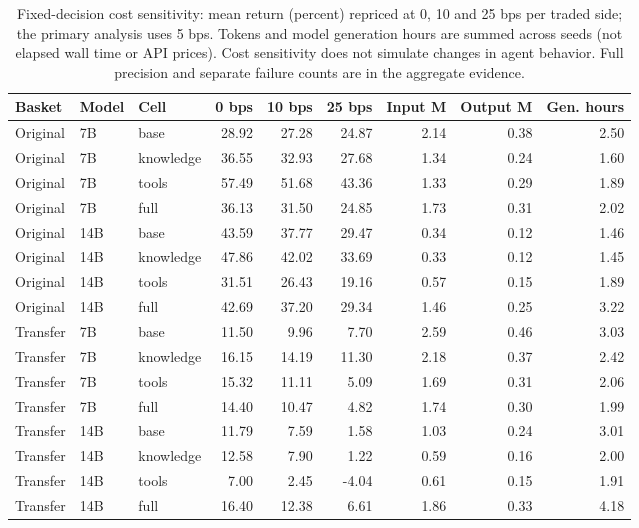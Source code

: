 \begin{table}[t]
\centering\small
\setlength{\tabcolsep}{4pt}
\begin{tabular}{lllrrrrrr}
\toprule
Basket & Model & Cell & 0 bps & 10 bps & 25 bps & Input M & Output M & Gen. hours \\
\midrule
Original & 7B & base & 28.92 & 27.28 & 24.87 & 2.14 & 0.38 & 2.50 \\
Original & 7B & knowledge & 36.55 & 32.93 & 27.68 & 1.34 & 0.24 & 1.60 \\
Original & 7B & tools & 57.49 & 51.68 & 43.36 & 1.33 & 0.29 & 1.89 \\
Original & 7B & full & 36.13 & 31.50 & 24.85 & 1.73 & 0.31 & 2.02 \\
Original & 14B & base & 43.59 & 37.77 & 29.47 & 0.34 & 0.12 & 1.46 \\
Original & 14B & knowledge & 47.86 & 42.02 & 33.69 & 0.33 & 0.12 & 1.45 \\
Original & 14B & tools & 31.51 & 26.43 & 19.16 & 0.57 & 0.15 & 1.89 \\
Original & 14B & full & 42.69 & 37.20 & 29.34 & 1.46 & 0.25 & 3.22 \\
Transfer & 7B & base & 11.50 & 9.96 & 7.70 & 2.59 & 0.46 & 3.03 \\
Transfer & 7B & knowledge & 16.15 & 14.19 & 11.30 & 2.18 & 0.37 & 2.42 \\
Transfer & 7B & tools & 15.32 & 11.11 & 5.09 & 1.69 & 0.31 & 2.06 \\
Transfer & 7B & full & 14.40 & 10.47 & 4.82 & 1.74 & 0.30 & 1.99 \\
Transfer & 14B & base & 11.79 & 7.59 & 1.58 & 1.03 & 0.24 & 3.01 \\
Transfer & 14B & knowledge & 12.58 & 7.90 & 1.22 & 0.59 & 0.16 & 2.00 \\
Transfer & 14B & tools & 7.00 & 2.45 & -4.04 & 0.61 & 0.15 & 1.91 \\
Transfer & 14B & full & 16.40 & 12.38 & 6.61 & 1.86 & 0.33 & 4.18 \\
\bottomrule
\end{tabular}
\caption{Fixed-decision cost sensitivity: mean return (percent) repriced at 0, 10 and 25 bps per traded side; the primary analysis uses 5 bps. Tokens and model generation hours are summed across seeds (not elapsed wall time or API prices). Cost sensitivity does not simulate changes in agent behavior. Full precision and separate failure counts are in the aggregate evidence.}
\label{tab:factorial-cost}
\end{table}
